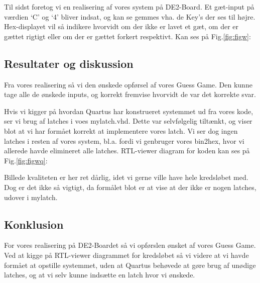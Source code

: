 \documentclass[../journal.tex]{subfiles}
\begin{document}
Til sidst foretog vi en realisering af vores system på DE2-Board. Et gæt-input på værdien `C' og `4' bliver indsat, og kan se gemmes vha. de Key's der ses til højre. Hex-displayet vil så indikere hvorvidt om der ikke er lavet et gæt, om der er gættet rigtigt eller om der er gættet forkert respektivt. Kan ses på Fig.\ref{fig:figw}:



\subsection{Resultater og diskussion}

Fra vores realisering så vi den ønskede opførsel af vores Guess Game. Den kunne tage alle de ønskede inputs, og korrekt fremvise hvorvidt de var det korrekte svar. \par 
Hvis vi kigger på hvordan Quartus har konstrueret systemmet ud fra vores kode, ser vi brug af latches i voes mylatch.vhd. Dette var selvfølgelig tiltænkt, og viser blot at vi har formået korrekt at implementere vores latch. Vi ser dog ingen latches i resten af vores system, bl.a. fordi vi genbruger vores bin2hex, hvor vi allerede havde elimineret alle latches. RTL-viewer diagram for koden kan ses på Fig.\ref{fig:figwq}:


Billede kvaliteten er her ret dårlig, idet vi gerne ville have hele kredsløbet med. Dog er det ikke så vigtigt, da formålet blot er at vise at der ikke er nogen latches, udover i mylatch.


\subsection{Konklusion}
For vores realisering på DE2-Boardet så vi opførslen ønsket af vores Guess Game. Ved at kigge på RTL-viewer diagrammet for kredsløbet så vi videre at vi havde formået at opstille systemmet, uden at Quartus behøvede at gøre brug af unødige latches, og at vi selv kunne indsætte en latch hvor vi ønskede.
\end{document}
